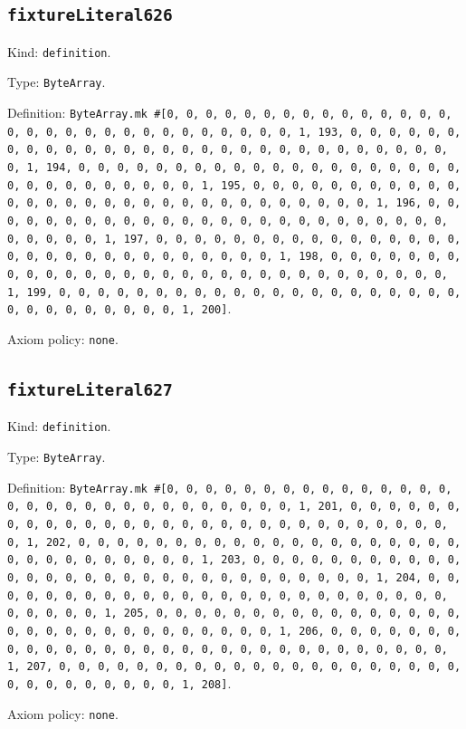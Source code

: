 \documentclass[11pt]{article}
\begin{document}
\subsection*{\texttt{fixtureLiteral626}}
\noindent Kind: \texttt{definition}.\par
\noindent Type: \texttt{ByteArray}.\par
\noindent Definition: \texttt{ByteArray.mk \#[0, 0, 0, 0, 0, 0, 0, 0, 0, 0, 0, 0, 0, 0, 0, 0, 0, 0, 0, 0, 0, 0, 0, 0, 0, 0, 0, 0, 0, 0, 1, 193, 0, 0, 0, 0, 0, 0, 0, 0, 0, 0, 0, 0, 0, 0, 0, 0, 0, 0, 0, 0, 0, 0, 0, 0, 0, 0, 0, 0, 0, 0, 1, 194, 0, 0, 0, 0, 0, 0, 0, 0, 0, 0, 0, 0, 0, 0, 0, 0, 0, 0, 0, 0, 0, 0, 0, 0, 0, 0, 0, 0, 0, 0, 1, 195, 0, 0, 0, 0, 0, 0, 0, 0, 0, 0, 0, 0, 0, 0, 0, 0, 0, 0, 0, 0, 0, 0, 0, 0, 0, 0, 0, 0, 0, 0, 1, 196, 0, 0, 0, 0, 0, 0, 0, 0, 0, 0, 0, 0, 0, 0, 0, 0, 0, 0, 0, 0, 0, 0, 0, 0, 0, 0, 0, 0, 0, 0, 1, 197, 0, 0, 0, 0, 0, 0, 0, 0, 0, 0, 0, 0, 0, 0, 0, 0, 0, 0, 0, 0, 0, 0, 0, 0, 0, 0, 0, 0, 0, 0, 1, 198, 0, 0, 0, 0, 0, 0, 0, 0, 0, 0, 0, 0, 0, 0, 0, 0, 0, 0, 0, 0, 0, 0, 0, 0, 0, 0, 0, 0, 0, 0, 1, 199, 0, 0, 0, 0, 0, 0, 0, 0, 0, 0, 0, 0, 0, 0, 0, 0, 0, 0, 0, 0, 0, 0, 0, 0, 0, 0, 0, 0, 0, 0, 1, 200]}.\par
\noindent Axiom policy: \texttt{none}.\par
\subsection*{\texttt{fixtureLiteral627}}
\noindent Kind: \texttt{definition}.\par
\noindent Type: \texttt{ByteArray}.\par
\noindent Definition: \texttt{ByteArray.mk \#[0, 0, 0, 0, 0, 0, 0, 0, 0, 0, 0, 0, 0, 0, 0, 0, 0, 0, 0, 0, 0, 0, 0, 0, 0, 0, 0, 0, 0, 0, 1, 201, 0, 0, 0, 0, 0, 0, 0, 0, 0, 0, 0, 0, 0, 0, 0, 0, 0, 0, 0, 0, 0, 0, 0, 0, 0, 0, 0, 0, 0, 0, 1, 202, 0, 0, 0, 0, 0, 0, 0, 0, 0, 0, 0, 0, 0, 0, 0, 0, 0, 0, 0, 0, 0, 0, 0, 0, 0, 0, 0, 0, 0, 0, 1, 203, 0, 0, 0, 0, 0, 0, 0, 0, 0, 0, 0, 0, 0, 0, 0, 0, 0, 0, 0, 0, 0, 0, 0, 0, 0, 0, 0, 0, 0, 0, 1, 204, 0, 0, 0, 0, 0, 0, 0, 0, 0, 0, 0, 0, 0, 0, 0, 0, 0, 0, 0, 0, 0, 0, 0, 0, 0, 0, 0, 0, 0, 0, 1, 205, 0, 0, 0, 0, 0, 0, 0, 0, 0, 0, 0, 0, 0, 0, 0, 0, 0, 0, 0, 0, 0, 0, 0, 0, 0, 0, 0, 0, 0, 0, 1, 206, 0, 0, 0, 0, 0, 0, 0, 0, 0, 0, 0, 0, 0, 0, 0, 0, 0, 0, 0, 0, 0, 0, 0, 0, 0, 0, 0, 0, 0, 0, 1, 207, 0, 0, 0, 0, 0, 0, 0, 0, 0, 0, 0, 0, 0, 0, 0, 0, 0, 0, 0, 0, 0, 0, 0, 0, 0, 0, 0, 0, 0, 0, 1, 208]}.\par
\noindent Axiom policy: \texttt{none}.\par
\end{document}
